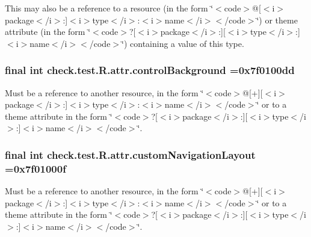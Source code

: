 This may also be a reference to a resource (in the form \char`\"{}$<$code$>$@\mbox{[}$<$i$>$package$<$/i$>$\+:\mbox{]}$<$i$>$type$<$/i$>$\+:$<$i$>$name$<$/i$>$$<$/code$>$\char`\"{}) or theme attribute (in the form \char`\"{}$<$code$>$?\mbox{[}$<$i$>$package$<$/i$>$\+:\mbox{]}\mbox{[}$<$i$>$type$<$/i$>$\+:\mbox{]}$<$i$>$name$<$/i$>$$<$/code$>$\char`\"{}) containing a value of this type. \hypertarget{classcheck_1_1test_1_1_r_1_1attr_a7aec8ace341918ac5a656918317fe5a6}{}
\subsubsection[{control\+Background}]{\setlength{\rightskip}{0pt plus 5cm}final int check.\+test.\+R.\+attr.\+control\+Background =0x7f0100dd\hspace{0.3cm}{\ttfamily [static]}}\label{classcheck_1_1test_1_1_r_1_1attr_a7aec8ace341918ac5a656918317fe5a6}
Must be a reference to another resource, in the form \char`\"{}$<$code$>$@\mbox{[}+\mbox{]}\mbox{[}$<$i$>$package$<$/i$>$\+:\mbox{]}$<$i$>$type$<$/i$>$\+:$<$i$>$name$<$/i$>$$<$/code$>$\char`\"{} or to a theme attribute in the form \char`\"{}$<$code$>$?\mbox{[}$<$i$>$package$<$/i$>$\+:\mbox{]}\mbox{[}$<$i$>$type$<$/i$>$\+:\mbox{]}$<$i$>$name$<$/i$>$$<$/code$>$\char`\"{}. \hypertarget{classcheck_1_1test_1_1_r_1_1attr_a6132e124e79744e029a15cfffe9bc575}{}
\subsubsection[{custom\+Navigation\+Layout}]{\setlength{\rightskip}{0pt plus 5cm}final int check.\+test.\+R.\+attr.\+custom\+Navigation\+Layout =0x7f01000f\hspace{0.3cm}{\ttfamily [static]}}\label{classcheck_1_1test_1_1_r_1_1attr_a6132e124e79744e029a15cfffe9bc575}
Must be a reference to another resource, in the form \char`\"{}$<$code$>$@\mbox{[}+\mbox{]}\mbox{[}$<$i$>$package$<$/i$>$\+:\mbox{]}$<$i$>$type$<$/i$>$\+:$<$i$>$name$<$/i$>$$<$/code$>$\char`\"{} or to a theme attribute in the form \char`\"{}$<$code$>$?\mbox{[}$<$i$>$package$<$/i$>$\+:\mbox{]}\mbox{[}$<$i$>$type$<$/i$>$\+:\mbox{]}$<$i$>$name$<$/i$>$$<$/code$>$\char`\"{}. \hypertarget{classcheck_1_1test_1_1_r_1_1attr_a3f57a68c10afd741f6c53c31355e1052}{}
